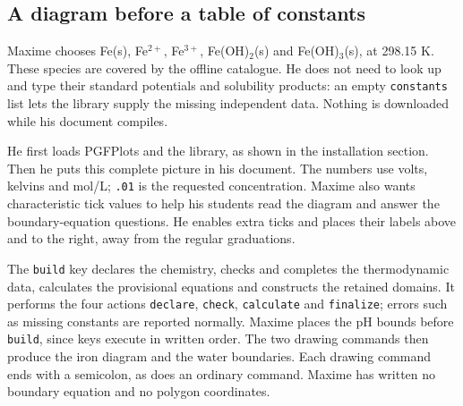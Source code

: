\documentclass[a4paper,11pt]{ltxdoc}
\begin{document}
\subsection{A diagram before a table of constants}
Maxime chooses Fe(s), Fe$^{2+}$, Fe$^{3+}$, Fe(OH)$_2$(s) and Fe(OH)$_3$(s), at
298.15 K. These species are covered by the offline catalogue. He does not need
to look up and type their standard potentials and solubility products: an empty
\texttt{constants} list lets the library supply the missing independent data.
Nothing is downloaded while his document compiles.

He first loads PGFPlots and the library, as shown in the installation section.
Then he puts this complete picture in his document. The numbers use volts,
kelvins and mol/L; \texttt{.01} is the requested concentration. Maxime also
wants characteristic tick values to help his students read the diagram and
answer the boundary-equation questions. He enables extra ticks and places
their labels above and to the right, away from the regular graduations.

\begin{codeexample}[width=10cm]
\end{codeexample}

The \texttt{build} key declares the chemistry, checks and completes the
thermodynamic data, calculates the provisional equations and constructs the
retained domains. It performs the four actions \texttt{declare}, \texttt{check},
\texttt{calculate} and \texttt{finalize}; errors such as missing constants are
reported normally. Maxime places the pH bounds before \texttt{build}, since keys
execute in written order. The two drawing commands
then produce the iron diagram and the water boundaries. Each drawing command
ends with a semicolon, as does an ordinary  command. Maxime has written no
boundary equation and no polygon coordinates.
\end{document}
